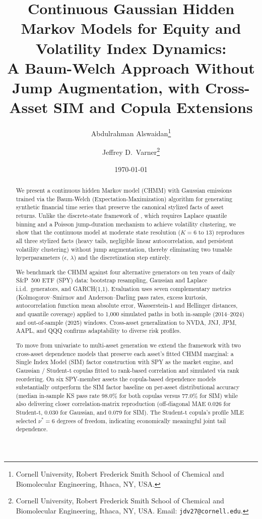 \documentclass[11pt,a4paper]{article}
\title{Continuous Gaussian Hidden Markov Models for Equity and Volatility Index Dynamics:\\A Baum-Welch Approach Without Jump Augmentation, with Cross-Asset SIM and Copula Extensions}
\author{
    Abdulrahman Alswaidan\thanks{Cornell University, Robert Frederick Smith School of Chemical and Biomolecular Engineering, Ithaca, NY, USA.}
    \and
    Jeffrey D.\ Varner\thanks{Cornell University, Robert Frederick Smith School of Chemical and Biomolecular Engineering, Ithaca, NY, USA. Email: \texttt{jdv27@cornell.edu}.}
}
\date{\today}
\begin{document}
\maketitle

\begin{abstract}
We present a continuous hidden Markov model (CHMM) with Gaussian emissions trained via the Baum-Welch (Expectation-Maximization) algorithm for generating synthetic financial time series that preserve the canonical stylized facts of asset returns.
Unlike the discrete-state framework of \citet{alswaidan2026hybrid}, which requires Laplace quantile binning and a Poisson jump-duration mechanism to achieve volatility clustering, we show that the continuous model at moderate state resolution ($K = 6$ to $13$) reproduces all three stylized facts (heavy tails, negligible linear autocorrelation, and persistent volatility clustering) without jump augmentation, thereby eliminating two tunable hyperparameters ($\epsilon$, $\lambda$) and the discretization step entirely.

We benchmark the CHMM against four alternative generators on ten years of daily S\&P~500 ETF (SPY) data: bootstrap resampling, Gaussian and Laplace i.i.d.\ generators, and GARCH(1,1).
Evaluation uses seven complementary metrics (Kolmogorov--Smirnov and Anderson--Darling pass rates, excess kurtosis, autocorrelation function mean absolute error, Wasserstein-1 and Hellinger distances, and quantile coverage) applied to 1{,}000 simulated paths in both in-sample (2014--2024) and out-of-sample (2025) windows.
Cross-asset generalization to NVDA, JNJ, JPM, AAPL, and QQQ confirms adaptability to diverse risk profiles.

To move from univariate to multi-asset generation we extend the framework with two cross-asset dependence models that preserve each asset's fitted CHMM marginal: a Single Index Model (SIM) factor construction with SPY as the market engine, and Gaussian / Student-t copulas fitted to rank-based correlation and simulated via rank reordering.
On six SPY-member assets the copula-based dependence models substantially outperform the SIM factor baseline on per-asset distributional accuracy (median in-sample KS pass rate 98.0\% for both copulas versus 77.0\% for SIM) while also delivering closer correlation-matrix reproduction (off-diagonal MAE 0.026 for Student-t, 0.030 for Gaussian, and 0.079 for SIM).
The Student-t copula's profile MLE selected $\nu^{*} = 6$ degrees of freedom, indicating economically meaningful joint tail dependence.


\end{abstract}
\end{document}
